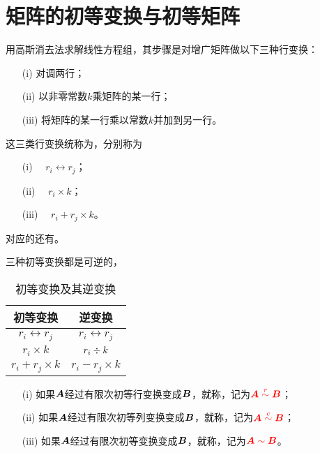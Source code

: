 \section{矩阵的初等变换与初等矩阵}

\begin{frame}
  用高斯消去法求解线性方程组，其步骤是对增广矩阵做以下三种行变换：
  \begin{itemize}
  \item[(i)] 对调两行；
  \item[(ii)] 以非零常数$k$乘矩阵的某一行；
  \item[(iii)] 将矩阵的某一行乘以常数$k$并加到另一行。
  \end{itemize}
  这三类行变换统称为，\pause 分别称为
  \begin{itemize}
  \item[(i)]   $\quad r_i \leftrightarrow r_j$；
  \item[(ii)]        $\quad r_i \times k$；
  \item[(iii)]  $\quad r_i + r_j \times k $。
  \end{itemize}
  \pause 对应的还有。 \pause {}
\end{frame}


\begin{frame}
  三种初等变换都是可逆的，
  \begin{table}[htbp]
    \centering
    \begin{tabular}{|c|c|} \hline
      初等变换 &  逆变换 \\\hline
      $r_i \leftrightarrow r_j$ & $r_i \leftrightarrow r_j$ \\[0.2cm]\hline
      $r_i \times k$ & $\displaystyle r_i \div k$ \\[0.2cm]\hline
      $r_i + r_j \times k$ & $r_i - r_j\times k$ \\[0.2cm]\hline
    \end{tabular}
    \caption{初等变换及其逆变换}
  \end{table}

\end{frame}


\begin{frame}

  \begin{dingyi}[矩阵的等价]
    
    \begin{itemize}
    \item[(i)] 如果$\boldsymbol{A}$经过有限次初等行变换变成$\boldsymbol{B}$，就称，记为$\textcolor{red}{\boldsymbol{A}\overset{r}{\sim} \boldsymbol{B}}$；
    \item[(ii)] 如果$\boldsymbol{A}$经过有限次初等列变换变成$\boldsymbol{B}$，就称，记为$\textcolor{red}{\boldsymbol{A}\overset{c}{\sim} \boldsymbol{B}}$；
    \item[(iii)] 如果$\boldsymbol{A}$经过有限次初等变换变成$\boldsymbol{B}$，就称，记为$\textcolor{red}{\boldsymbol{A}\sim \boldsymbol{B}}$。
    \end{itemize}
  \end{dingyi}
\end{frame}


